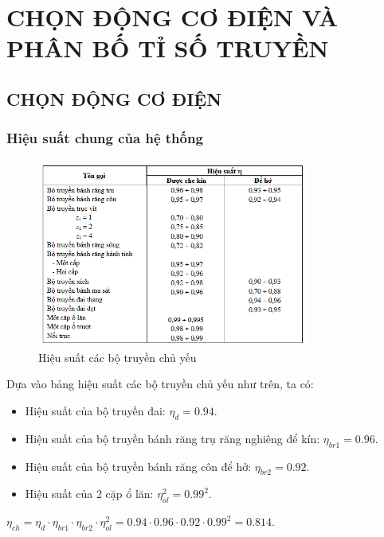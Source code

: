 \chapter{CHỌN ĐỘNG CƠ ĐIỆN VÀ PHÂN BỐ TỈ SỐ TRUYỀN}
    \section{CHỌN ĐỘNG CƠ ĐIỆN}
        \subsection{Hiệu suất chung của hệ thống}
            \begin{figure}[H]
                \centering
                \includegraphics[width=0.8\textwidth]{pictures/table_1.png}
                \caption{Hiệu suất các bộ truyền chủ yếu}
            \end{figure}
            \hspace*{0.6cm}Dựa vào bảng hiệu suất các bộ truyền chủ yếu như trên, ta có:
            \begin{itemize}
                \item Hiệu suất của bộ truyền đai: $\eta_{d} = 0.94$.
                \item Hiệu suất của bộ truyền bánh răng trụ răng nghiêng để kín: $\eta_{br1} = 0.96$.
                \item Hiệu suất của bộ truyền bánh răng côn để hở: $\eta_{br2} = 0.92$.
                \item Hiệu suất của 2 cặp ổ lăn: $\eta_{ol}^2 = 0.99^2$.
            \end{itemize}
            \begin{center}
                $\eta_{ch}=\eta_{d} \cdot \eta_{br1} \cdot \eta_{br2} \cdot \eta_{ol}^2 = 0.94 \cdot 0.96 \cdot 0.92 \cdot 0.99^2 = 0.814 $.
            \end{center}
